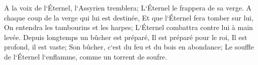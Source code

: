 \verse A la voix de l`Éternel, l`Assyrien tremblera; L`Éternel le frappera de sa verge. 
\verse A chaque coup de la verge qui lui est destinée, Et que l`Éternel fera tomber sur lui, On entendra les tambourins et les harpes; L`Éternel combattra contre lui à main levée. 
\verse Depuis longtemps un bûcher est préparé, Il est préparé pour le roi, Il est profond, il est vaste; Son bûcher, c`est du feu et du bois en abondance; Le souffle de l`Éternel l`enflamme, comme un torrent de soufre. 

\chapter{}

